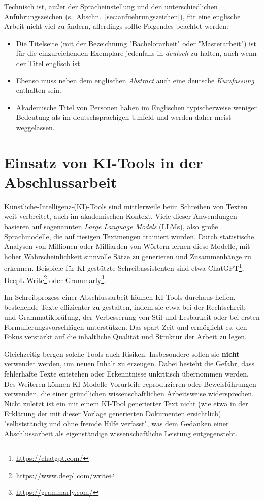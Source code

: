 Technisch ist, außer der Spracheinstellung und den unterschiedlichen
Anführungszeichen (s.\ Abschn.~\ref{sec:anfuehrungszeichen}), für eine
englische Arbeit nicht viel zu ändern, allerdings sollte Folgendes beachtet
werden:
%
\begin{itemize}
    \item Die Titelseite (mit der Bezeichnung "Bachelorarbeit" oder
    "Masterarbeit") ist für die einzureichenden Exemplare jedenfalls in
    \emph{deutsch} zu halten, auch wenn der Titel englisch ist.
    \item Ebenso muss neben dem englischen \emph{Abstract} auch eine deutsche
    \emph{Kurzfassung} enthalten sein. %
    \item Akademische Titel von Personen haben im Englischen typischerweise
    weniger Bedeutung als im deutschsprachigen Umfeld und werden daher meist
    weggelassen.
\end{itemize}


\section{Einsatz von KI-Tools in der Abschlussarbeit}

Künstliche-Intelligenz-(KI)-Tools sind mittlerweile beim Schreiben von Texten
weit verbreitet, auch im akademischen Kontext. Viele dieser Anwendungen
basieren auf sogenannten \emph{Large Language Models} (LLMs), also große
Sprachmodelle, die auf riesigen Textmengen trainiert wurden. Durch statistische
Analysen von Millionen oder Milliarden von Wörtern lernen diese Modelle, mit
hoher Wahrscheinlichkeit sinnvolle Sätze zu generieren und Zusammenhänge zu
erkennen. Beispiele für KI-gestützte Schreibassistenten sind etwa
ChatGPT\footnote{\url{https://chatgpt.com/}}, 
DeepL Write\footnote{\url{https://www.deepl.com/write}} oder 
Grammarly\footnote{\url{https://grammarly.com/}}.

Im Schreibprozess einer Abschlussarbeit können KI-Tools durchaus helfen,
bestehende Texte effizienter zu gestalten, indem sie etwa bei der Rechtschreib-
und Grammatikprüfung, der Verbesserung von Stil und Lesbarkeit oder bei ersten
Formulierungsvorschlägen unterstützen. Das spart Zeit und ermöglicht es, den
Fokus verstärkt auf die inhaltliche Qualität und Struktur der Arbeit zu legen.

Gleichzeitig bergen solche Tools auch Risiken. Insbesondere sollen sie
\textbf{nicht} verwendet werden, um neuen Inhalt zu erzeugen. Dabei besteht die
Gefahr, dass fehlerhafte Texte entstehen oder Erkenntnisse unkritisch
übernommen werden. Des Weiteren können KI-Modelle Vorurteile reproduzieren oder
Beweisführungen verwenden, die einer gründlichen wissenschaftlichen Arbeitsweise
widersprechen. Nicht zuletzt ist ein mit einem KI-Tool generierter Text nicht
(wie etwa in der Erklärung der mit dieser Vorlage generierten Dokumenten
ersichtlich) "selbstständig und ohne fremde Hilfe verfasst", was dem Gedanken
einer Abschlussarbeit als eigenständige wissenschaftliche Leistung
entgegensteht.

